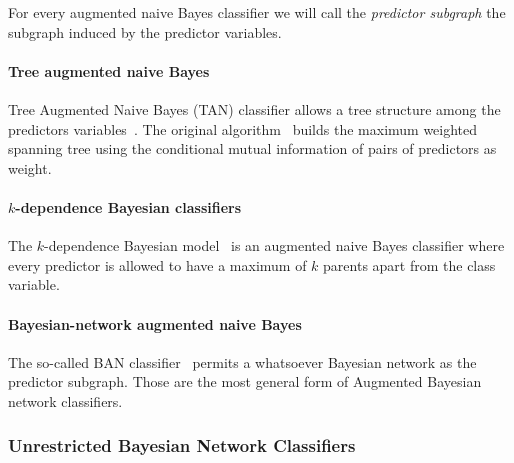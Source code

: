\documentclass[11pt,a4paper, twoside]{book}
\begin{document}
For every augmented naive Bayes classifier we will call the \textit{predictor subgraph} the subgraph induced by the predictor variables. 

\paragraph{Tree augmented naive Bayes}

Tree Augmented Naive Bayes (TAN) classifier allows a tree structure among the predictors variables~\citep{Friedman1997}. The original algorithm~\citep{chow1968} builds the maximum weighted spanning tree using the conditional mutual information of pairs of predictors as weight.

\paragraph{$k$-dependence Bayesian classifiers}

The $k$-dependence Bayesian model~\citep{Sahami1996} is an augmented naive Bayes classifier where every predictor is allowed to have a maximum of $k$ parents apart from the class variable.

\paragraph{Bayesian-network augmented naive Bayes}

The so-called BAN classifier~\citep{Friedman1997,Cheng1999, Cheng2001} permits a whatsoever Bayesian network as the predictor subgraph. Those are the most general form of Augmented Bayesian network classifiers. 

\subsubsection{Unrestricted Bayesian Network Classifiers}
\end{document}
